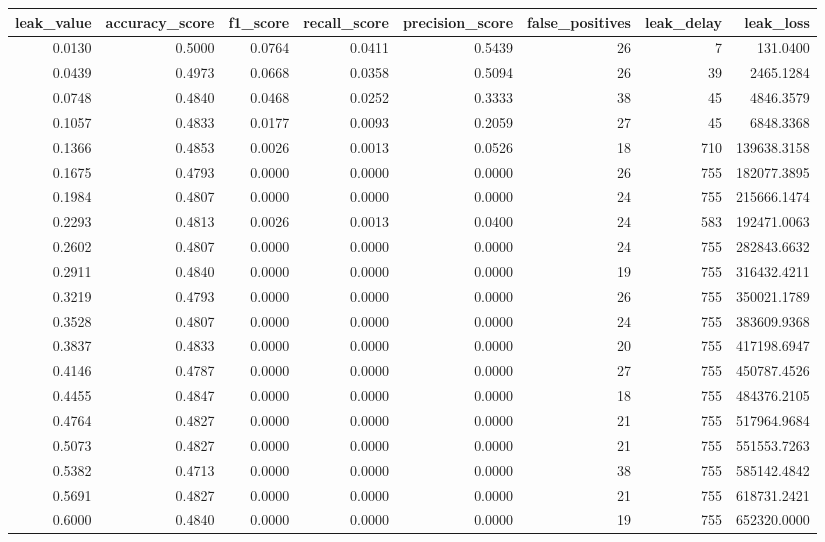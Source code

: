 \begin{tabular}{rrrrrrrr}
\toprule
leak\_value & accuracy\_score & f1\_score & recall\_score & precision\_score & false\_positives & leak\_delay & leak\_loss \\
\midrule
0.0130 & 0.5000 & 0.0764 & 0.0411 & 0.5439 & 26 & 7 & 131.0400 \\
0.0439 & 0.4973 & 0.0668 & 0.0358 & 0.5094 & 26 & 39 & 2465.1284 \\
0.0748 & 0.4840 & 0.0468 & 0.0252 & 0.3333 & 38 & 45 & 4846.3579 \\
0.1057 & 0.4833 & 0.0177 & 0.0093 & 0.2059 & 27 & 45 & 6848.3368 \\
0.1366 & 0.4853 & 0.0026 & 0.0013 & 0.0526 & 18 & 710 & 139638.3158 \\
0.1675 & 0.4793 & 0.0000 & 0.0000 & 0.0000 & 26 & 755 & 182077.3895 \\
0.1984 & 0.4807 & 0.0000 & 0.0000 & 0.0000 & 24 & 755 & 215666.1474 \\
0.2293 & 0.4813 & 0.0026 & 0.0013 & 0.0400 & 24 & 583 & 192471.0063 \\
0.2602 & 0.4807 & 0.0000 & 0.0000 & 0.0000 & 24 & 755 & 282843.6632 \\
0.2911 & 0.4840 & 0.0000 & 0.0000 & 0.0000 & 19 & 755 & 316432.4211 \\
0.3219 & 0.4793 & 0.0000 & 0.0000 & 0.0000 & 26 & 755 & 350021.1789 \\
0.3528 & 0.4807 & 0.0000 & 0.0000 & 0.0000 & 24 & 755 & 383609.9368 \\
0.3837 & 0.4833 & 0.0000 & 0.0000 & 0.0000 & 20 & 755 & 417198.6947 \\
0.4146 & 0.4787 & 0.0000 & 0.0000 & 0.0000 & 27 & 755 & 450787.4526 \\
0.4455 & 0.4847 & 0.0000 & 0.0000 & 0.0000 & 18 & 755 & 484376.2105 \\
0.4764 & 0.4827 & 0.0000 & 0.0000 & 0.0000 & 21 & 755 & 517964.9684 \\
0.5073 & 0.4827 & 0.0000 & 0.0000 & 0.0000 & 21 & 755 & 551553.7263 \\
0.5382 & 0.4713 & 0.0000 & 0.0000 & 0.0000 & 38 & 755 & 585142.4842 \\
0.5691 & 0.4827 & 0.0000 & 0.0000 & 0.0000 & 21 & 755 & 618731.2421 \\
0.6000 & 0.4840 & 0.0000 & 0.0000 & 0.0000 & 19 & 755 & 652320.0000 \\
\bottomrule
\end{tabular}
